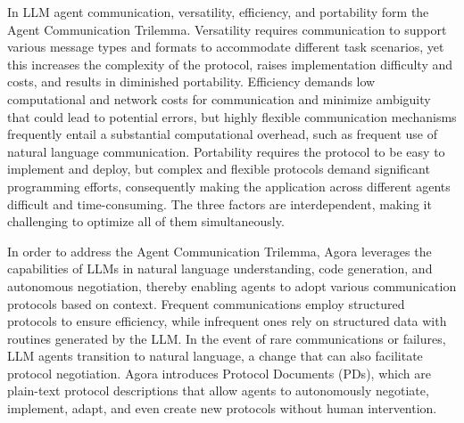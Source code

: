 \documentclass[10pt,preprint]{article}
\begin{document}
In LLM agent communication, versatility, efficiency, and portability form the Agent Communication Trilemma. Versatility requires communication to support various message types and formats to accommodate different task scenarios, yet this increases the complexity of the protocol, raises implementation difficulty and costs, and results in diminished portability. Efficiency demands low computational and network costs for communication and minimize ambiguity that could lead to potential errors, but highly flexible communication mechanisms frequently entail a substantial computational overhead, such as frequent use of natural language communication. Portability requires the protocol to be easy to implement and deploy, but complex and flexible protocols demand significant programming efforts, consequently making the application across different agents difficult and time-consuming. The three factors are interdependent, making it challenging to optimize all of them simultaneously.

In order to address the Agent Communication Trilemma, Agora leverages the capabilities of LLMs in natural language understanding, code generation, and autonomous negotiation, thereby enabling agents to adopt various communication protocols based on context. Frequent communications employ structured protocols to ensure efficiency, while infrequent ones rely on structured data with routines generated by the LLM. In the event of rare communications or failures, LLM agents transition to natural language, a change that can also facilitate protocol negotiation. Agora introduces Protocol Documents (PDs), which are plain-text protocol descriptions that allow agents to autonomously negotiate, implement, adapt, and even create new protocols without human intervention.
\end{document}
